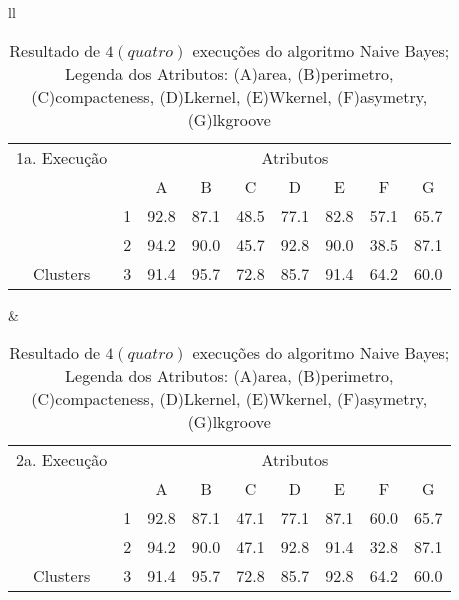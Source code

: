 \begin{table}[!h]
\caption{Resultado de ${4(quatro)}$ execuções do algoritmo Naive Bayes; Legenda dos Atributos: (A)area, (B)perimetro, (C)compacteness, (D)Lkernel, (E)Wkernel, (F)asymetry, (G)lkgroove}
 \begin{tabular}{ll}

  
   \small\addtolength{\tabcolsep}{-4pt}
     \begin{tabular}{|cl|c|c|c|c|c|c|c|}
        \hline \hline
            {\tiny 1a. Execução}     &   & \multicolumn{7}{c|}{Atributos}                                               \\ \cline{3-9} 
       \multicolumn{1}{|l}{}                            &   & A    & B & C & D & E & F & G \\ \hline
        \multicolumn{1}{|c|}{}                           & 1 & 92.8 & 87.1   & 48.5      & 77.1 & 82.8 & 57.1   & 65.7   \\ \cline{2-9} 
        \multicolumn{1}{|c|}{}                           & 2 & 94.2 & 90.0   & 45.7      & 92.8 & 90.0 & 38.5  & 87.1  \\ \cline{2-9} 
        \multicolumn{1}{|c|}{\multirow{-3}{*}{Clusters}} & 3 & 91.4 & 95.7   & 72.8      & 85.7 & 91.4 & 64.2  & 60.0  \\ \hline
      \end{tabular}
 &
 
   
   \small\addtolength{\tabcolsep}{-4pt}
   \begin{tabular}{|cl|c|c|c|c|c|c|c|}
        \hline \hline
             {\tiny 2a. Execução }       &   & \multicolumn{7}{c|}{Atributos}                                               \\ \cline{3-9} 
       \multicolumn{1}{|l}{}                            &   & A    & B & C & D & E & F & G \\ \hline
        \multicolumn{1}{|c|}{}                           & 1 & 92.8 & 87.1   & 47.1      & 77.1 & 87.1 & 60.0   & 65.7   \\ \cline{2-9} 
        \multicolumn{1}{|c|}{}                           & 2 & 94.2 & 90.0   & 47.1      & 92.8 & 91.4 & 32.8  & 87.1  \\ \cline{2-9} 
        \multicolumn{1}{|c|}{\multirow{-3}{*}{Clusters}} & 3 & 91.4 & 95.7   & 72.8      & 85.7 & 92.8 & 64.2  & 60.0  \\ \hline
      \end{tabular}
  \\  [8ex]
 

\end{tabular}
\end{table}
